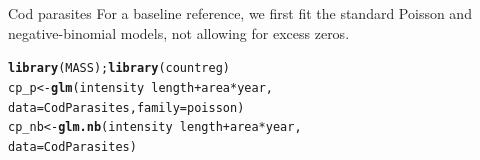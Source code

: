 \documentclass[11pt]{book}\usepackage[]{graphicx}\usepackage[]{color}
\makeatletter
\newcommand{\hlopt}[1]{\textcolor[rgb]{0,0,0}{#1}}%
\newcommand{\hlstd}[1]{\textcolor[rgb]{0.345,0.345,0.345}{#1}}%
\newcommand{\hlkwb}[1]{\textcolor[rgb]{0.69,0.353,0.396}{#1}}%
\newcommand{\hlkwc}[1]{\textcolor[rgb]{0.333,0.667,0.333}{#1}}%
\newcommand{\hlkwd}[1]{\textcolor[rgb]{0.737,0.353,0.396}{\textbf{#1}}}%
\newenvironment{kframe}{%
 \def\at@end@of@kframe{}%
 \ifinner\ifhmode%
  \def\at@end@of@kframe{\end{minipage}}%
  \begin{minipage}{\columnwidth}%
 \fi\fi%
 \def\FrameCommand##1{\hskip\@totalleftmargin \hskip-\fboxsep
 \colorbox{shadecolor}{##1}\hskip-\fboxsep
     \hskip-\linewidth \hskip-\@totalleftmargin \hskip\columnwidth}%
 \MakeFramed {\advance\hsize-\width
   \@totalleftmargin\z@ \linewidth\hsize
   \@setminipage}}%
 {\par\unskip\endMakeFramed%
 \at@end@of@kframe}
\newenvironment{knitrout}{}{} %
\renewenvironment{knitrout}{\small\renewcommand{\baselinestretch}{.85}}{} %
\makeatother
\begin{document}
\begin{Example}[cod2]{Cod parasites}
For a baseline reference, we first fit the standard Poisson and negative-binomial models, not
allowing for excess zeros.
\begin{knitrout}
\color{fgcolor}\begin{kframe}
\begin{alltt}
\hlkwd{library}\hlstd{(MASS);} \hlkwd{library}\hlstd{(countreg)}
\hlstd{cp_p}   \hlkwb{<-}    \hlkwd{glm}\hlstd{(intensity} \hlopt{~} \hlstd{length} \hlopt{+} \hlstd{area} \hlopt{*} \hlstd{year,}
                 \hlkwc{data} \hlstd{= CodParasites,} \hlkwc{family} \hlstd{= poisson)}
\hlstd{cp_nb}  \hlkwb{<-} \hlkwd{glm.nb}\hlstd{(intensity} \hlopt{~} \hlstd{length} \hlopt{+} \hlstd{area} \hlopt{*} \hlstd{year,}
                 \hlkwc{data} \hlstd{= CodParasites)}
\end{alltt}
\end{kframe}
\end{knitrout}


\end{Example}
\end{document}
